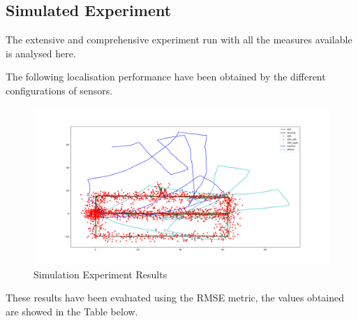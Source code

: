 \subsection{Simulated Experiment }
\noindent The extensive and comprehensive experiment run with all the measures available is analysed here.

The following localisation performance have been obtained by the different configurations of sensors.

\begin{figure}[!ht]
	\begin{center}
		\includegraphics[width=1\textwidth]{Images/5-Results/Sim-Control-WO-GPSs-IMUs.png}
	\end{center}
	\caption{Simulation Experiment Results}
	\label{fig:simRes}
\end{figure}

These results have been evaluated using the \gls{RMSE} metric, the values obtained are showed in the Table below.


